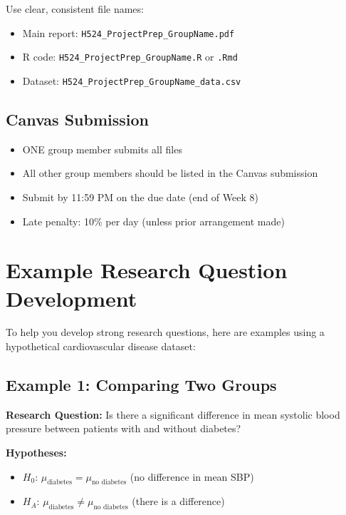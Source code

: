 \documentclass[11pt]{article}
\begin{document}
Use clear, consistent file names:

\begin{itemize}
\item Main report: \texttt{H524\_ProjectPrep\_GroupName.pdf}
\item R code: \texttt{H524\_ProjectPrep\_GroupName.R} or \texttt{.Rmd}
\item Dataset: \texttt{H524\_ProjectPrep\_GroupName\_data.csv}
\end{itemize}

\subsection*{Canvas Submission}

\begin{itemize}
\item ONE group member submits all files
\item All other group members should be listed in the Canvas submission
\item Submit by 11:59 PM on the due date (end of Week 8)
\item Late penalty: 10\% per day (unless prior arrangement made)
\end{itemize}

\newpage

\section*{Example Research Question Development}

To help you develop strong research questions, here are examples using a hypothetical cardiovascular disease dataset:

\subsection*{Example 1: Comparing Two Groups}

\textbf{Research Question:}
Is there a significant difference in mean systolic blood pressure between patients with and without diabetes?

\textbf{Hypotheses:}
\begin{itemize}
\item $H_0$: $\mu_{\text{diabetes}} = \mu_{\text{no diabetes}}$ (no difference in mean SBP)
\item $H_A$: $\mu_{\text{diabetes}} \neq \mu_{\text{no diabetes}}$ (there is a difference)
\end{itemize}
\end{document}
